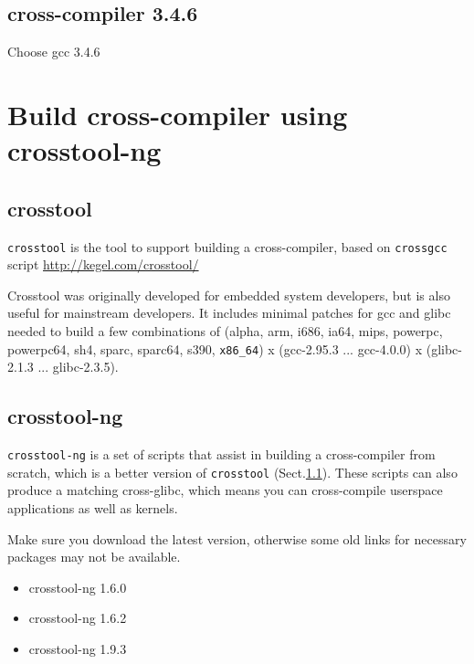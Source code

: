 \subsection{cross-compiler 3.4.6}
\label{sec:cross-compiler-GNU_3.4.6}

Choose gcc 3.4.6

\section{Build cross-compiler using crosstool-ng}



\subsection{crosstool}
\label{sec:crosstool}

\verb!crosstool! is the tool to support building a cross-compiler, based on
\verb!crossgcc! script
\url{http://kegel.com/crosstool/}

Crosstool was originally developed for embedded system developers, but is also
useful for mainstream developers.
It includes minimal patches for gcc and glibc needed to build a few combinations
of (alpha, arm, i686, ia64, mips, powerpc, powerpc64, sh4, sparc, sparc64, s390,
\verb!x86_64!) x (gcc-2.95.3 ... gcc-4.0.0) x (glibc-2.1.3 ... glibc-2.3.5).



\subsection{crosstool-ng}
\label{sec:crosstool-ng}

\verb!crosstool-ng! is a set of scripts that assist in building a cross-compiler
from scratch, which is a better version of \verb!crosstool! (Sect.\ref{sec:crosstool}).
These scripts can also produce a matching cross-glibc, which means you can
cross-compile userspace applications as well as kernels.

Make sure you download the latest version, otherwise some old links for
necessary packages may not be available.
\begin{itemize}
  \item crosstool-ng 1.6.0
  \item crosstool-ng 1.6.2
  \item crosstool-ng 1.9.3
\end{itemize}


